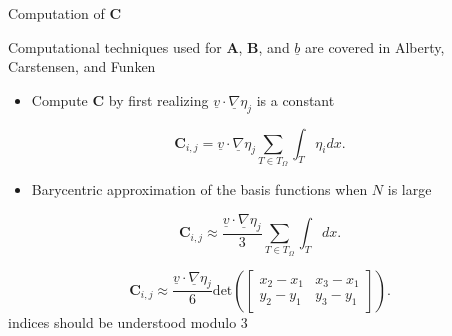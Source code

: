 \documentclass[10pt]{beamer}
\begin{document}
\begin{frame} {Computation of $\mathbf{C}$} \label{ComputationofC}

Computational techniques used for $\mathbf{A}$, $\mathbf{B}$, and $\underline{b}$ are covered in Alberty, Carstensen, and Funken
\begin{itemize}
\item Compute $\mathbf{C}$ by first realizing $\underline{v} \cdot \underline{\nabla}\eta_{j}$ is a constant
\end{itemize}
\begin{equation}
\mathbf{C}_{i,j} = \underline{v}\cdot \underline{\nabla}\eta_{j}\sum_{T \in T_{\Omega}}\int_{T}\eta_{i} dx.
\end{equation}

\begin{itemize}
\item Barycentric approximation of the basis functions when $N$ is large
\end{itemize}

\begin{equation}
\mathbf{C}_{i,j} \approx  \frac{\underline{v}\cdot \underline{\nabla}\eta_{j}}{3}\sum_{T \in T_{\Omega}}\int_{T} dx.
\end{equation}


\begin{equation}
 \mathbf{C}_{i,j}\approx \frac{\underline{v}\cdot \underline{\nabla}\eta_{j}}{6}\text{det}\left(\begin{bmatrix}x_{2}-x_{1} & x_{3}-x_{1} \\ y_{2}-y_{1} & y_{3}-y_{1} \end{bmatrix}\right).
\end{equation}
indices should be understood modulo 3

\hyperlink{Questions}{}
\end{frame}
\end{document}
